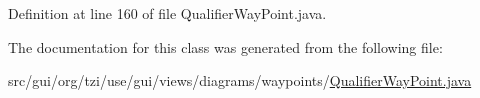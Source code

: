 Definition at line 160 of file Qualifier\-Way\-Point.\-java.



The documentation for this class was generated from the following file\-:\begin{DoxyCompactItemize}
\item 
src/gui/org/tzi/use/gui/views/diagrams/waypoints/\hyperlink{_qualifier_way_point_8java}{Qualifier\-Way\-Point.\-java}\end{DoxyCompactItemize}
